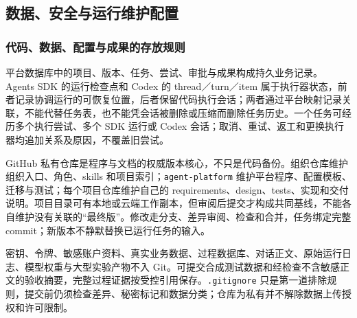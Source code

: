 \documentclass[11pt,a4paper]{article}
\begin{document}
\subsection{数据、安全与运行维护配置}
\label{sec:impl-operations}

\subsubsection{代码、数据、配置与成果的存放规则}

平台数据库中的项目、版本、任务、尝试、审批与成果构成持久业务记录。Agents SDK 的运行检查点和 Codex 的 thread／turn／item 属于执行器状态，前者记录协调运行的可恢复位置，后者保留代码执行会话；两者通过平台映射记录关联，不能代替任务表，也不能凭会话被删除或压缩而删除任务历史。一个任务可经历多个执行尝试、多个 SDK 运行或 Codex 会话；取消、重试、返工和更换执行器均追加关系及原因，不覆盖旧尝试。

GitHub 私有仓库是程序与文档的权威版本核心，不只是代码备份。组织仓库维护组织入口、角色、skills 和项目索引；\texttt{agent-platform} 维护平台程序、配置模板、迁移与测试；每个项目仓库维护自己的 requirements、design、tests、实现和交付说明。项目目录可有本地或云端工作副本，但审阅后提交才构成共同基线，不能各自维护没有关联的“最终版”。修改走分支、差异审阅、检查和合并，任务绑定完整 commit；新版本不静默替换已运行任务的输入。

密钥、令牌、敏感账户资料、真实业务数据、过程数据库、对话正文、原始运行日志、模型权重与大型实验产物不入 Git。可提交合成测试数据和经检查不含敏感正文的验收摘要，完整过程证据按受控引用保存。\texttt{.gitignore} 只是第一道排除规则，提交前仍须检查差异、秘密标记和数据分类；仓库为私有并不解除数据上传授权和许可限制。
\end{document}
